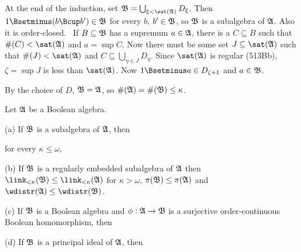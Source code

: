 {At the end of the induction, set
$\frak B=\bigcup_{\xi<\sat(\frak A)}D_{\xi}$.
Then $1\Bsetminus(b\Bcup b')\in\frak B$ for every $b$, $b'\in\frak B$,
so $\frak B$ is a subalgebra of $\frak A$.   Also it is order-closed.
\Prf\ If $B\subseteq\frak B$ has a supremum $a\in\frak A$, there is a
$C\subseteq B$ such that $\#(C)<\sat(\frak A)$ and $a=\sup C$.   Now
there must be some set $J\subseteq\sat(\frak A)$ such that
$\#(J)<\sat(\frak A)$ and $C\subseteq\bigcup_{\eta\in J}D_{\eta}$.
Since $\sat(\frak A)$ is
regular (513Bb), $\zeta=\sup J$ is less than $\sat(\frak A)$.
Now $1\Bsetminus a\in D_{\zeta+1}$ and $a\in\frak B$.\ \Qed

By the choice of $D$, $\frak B=\frak A$, so
$\#(\frak A)=\#(\frak B)\le\kappa$.
}%

 Let $\frak A$ be a Boolean algebra.

(a) If $\frak B$ is a subalgebra of $\frak A$, then



\noindent for every $\kappa\le\omega$,


(b) If $\frak B$ is a regularly embedded subalgebra of $\frak A$
then
$\link_{<\kappa}(\frak B)\le\link_{<\kappa}(\frak A)$ for
$\kappa>\omega$, $\pi(\frak B)\le\pi(\frak A)$ and
$\wdistr(\frak A)\le\wdistr(\frak B)$.

(c) If $\frak B$ is a Boolean algebra and $\phi:\frak A\to\frak B$ is a
surjective order-continuous Boolean homomorphism, then






(d) If $\frak B$ is a principal ideal of $\frak A$, then


